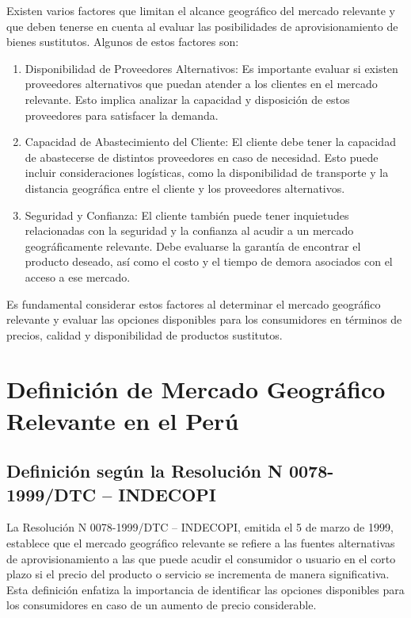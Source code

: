 \documentclass[
  doc,
  floatsintext,
  longtable,
  a4paper,
  nolmodern,
  notxfonts,
  notimes,
  12pt,
  colorlinks=true,linkcolor=blue,citecolor=blue,urlcolor=blue]{apa7}
\begin{document}
Existen varios factores que limitan el alcance geográfico del mercado
relevante y que deben tenerse en cuenta al evaluar las posibilidades de
aprovisionamiento de bienes sustitutos. Algunos de estos factores son:

\begin{enumerate}
\def\labelenumi{\arabic{enumi}.}
\item
  Disponibilidad de Proveedores Alternativos: Es importante evaluar si
  existen proveedores alternativos que puedan atender a los clientes en
  el mercado relevante. Esto implica analizar la capacidad y disposición
  de estos proveedores para satisfacer la demanda.
\item
  Capacidad de Abastecimiento del Cliente: El cliente debe tener la
  capacidad de abastecerse de distintos proveedores en caso de
  necesidad. Esto puede incluir consideraciones logísticas, como la
  disponibilidad de transporte y la distancia geográfica entre el
  cliente y los proveedores alternativos.
\item
  Seguridad y Confianza: El cliente también puede tener inquietudes
  relacionadas con la seguridad y la confianza al acudir a un mercado
  geográficamente relevante. Debe evaluarse la garantía de encontrar el
  producto deseado, así como el costo y el tiempo de demora asociados
  con el acceso a ese mercado.
\end{enumerate}

Es fundamental considerar estos factores al determinar el mercado
geográfico relevante y evaluar las opciones disponibles para los
consumidores en términos de precios, calidad y disponibilidad de
productos sustitutos.

\section{Definición de Mercado Geográfico Relevante en el
Perú}\label{definiciuxf3n-de-mercado-geogruxe1fico-relevante-en-el-peruxfa}

\subsection{Definición según la Resolución N 0078-1999/DTC --
INDECOPI}\label{definiciuxf3n-seguxfan-la-resoluciuxf3n-n-0078-1999dtc-indecopi}

La Resolución N 0078-1999/DTC -- INDECOPI, emitida el 5 de marzo de
1999, establece que el mercado geográfico relevante se refiere a las
fuentes alternativas de aprovisionamiento a las que puede acudir el
consumidor o usuario en el corto plazo si el precio del producto o
servicio se incrementa de manera significativa. Esta definición enfatiza
la importancia de identificar las opciones disponibles para los
consumidores en caso de un aumento de precio considerable.
\end{document}

